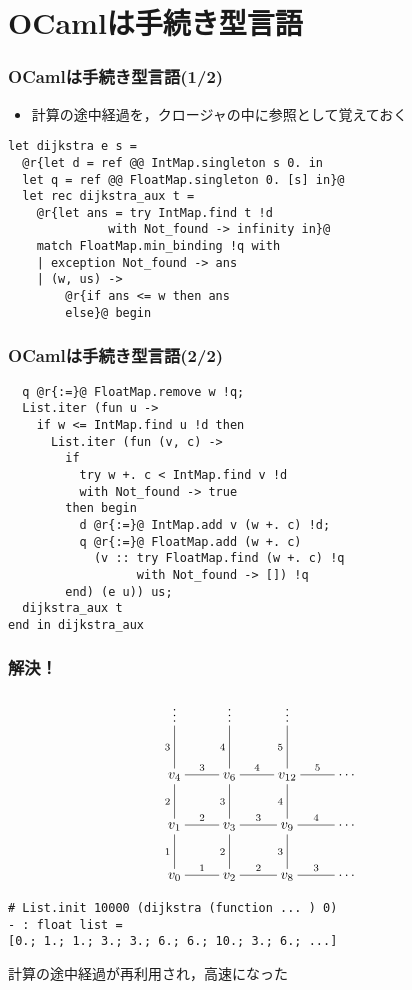 \documentclass[dvipdfmx,cjk,xcolor=dvipsnames,envcountsect,notheorems,12pt]{beamer}
\theoremstyle{definition}
\begin{document}
\section{OCamlは手続き型言語}

\begin{frame}[fragile]
	\frametitle{OCamlは手続き型言語(1/2)}
	\begin{itemize}
		\item 計算の途中経過を，クロージャの中に参照として覚えておく
	\end{itemize}
  \begin{lstlisting}
let dijkstra e s =
  @r{let d = ref @@ IntMap.singleton s 0. in
  let q = ref @@ FloatMap.singleton 0. [s] in}@
  let rec dijkstra_aux t =
    @r{let ans = try IntMap.find t !d
              with Not_found -> infinity in}@
    match FloatMap.min_binding !q with
    | exception Not_found -> ans
    | (w, us) ->
        @r{if ans <= w then ans
        else}@ begin
	\end{lstlisting}
\end{frame}
\begin{frame}[fragile]
	\frametitle{OCamlは手続き型言語(2/2)}
  \begin{lstlisting}
  q @r{:=}@ FloatMap.remove w !q;
  List.iter (fun u ->
    if w <= IntMap.find u !d then
      List.iter (fun (v, c) ->
        if
          try w +. c < IntMap.find v !d
          with Not_found -> true
        then begin
          d @r{:=}@ IntMap.add v (w +. c) !d;
          q @r{:=}@ FloatMap.add (w +. c)
            (v :: try FloatMap.find (w +. c) !q
                  with Not_found -> []) !q
        end) (e u)) us;
  dijkstra_aux t
end in dijkstra_aux
\end{lstlisting}
\end{frame}

\begin{frame}[fragile]
	\frametitle{解決！}
	\vspace{-7mm}
		\[\xymatrix{
			\vdots & \vdots & \vdots & \\
			v_{4} \ar@{-}[u]^-{3} \ar@{-}[r]^-{3} & v_{6} \ar@{-}[u]^-{4} \ar@{-}[r]^-{4} & v_{12} \ar@{-}[u]^-{5} \ar@{-}[r]^-{5} & \cdots \\
			v_{1} \ar@{-}[u]^-{2} \ar@{-}[r]^-{2} & v_{3} \ar@{-}[u]^-{3} \ar@{-}[r]^-{3} & v_{9} \ar@{-}[u]^-{4} \ar@{-}[r]^-{4} & \cdots \\
			v_{0} \ar@{-}[u]^-{1} \ar@{-}[r]^-{1} & v_{2} \ar@{-}[u]^-{2} \ar@{-}[r]^-{2} & v_{8} \ar@{-}[u]^-{3} \ar@{-}[r]^-{3} & \cdots \\
		} \]
	\vfill
	\begin{lstlisting}
# List.init 10000 (dijkstra (function ... ) 0)
- : float list =
[0.; 1.; 1.; 3.; 3.; 6.; 6.; 10.; 3.; 6.; ...]
\end{lstlisting}
	\begin{center}
		\large
		計算の途中経過が再利用され，高速になった
	\end{center}
\end{frame}
\end{document}
